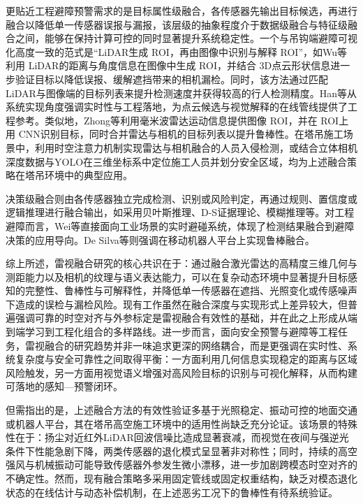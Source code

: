更贴近工程避障预警需求的是目标属性级融合，各传感器先输出目标候选，再进行融合以降低单一传感器误报与漏报，该层级的抽象程度介于数据级融合与特征级融合之间，能够在保持计算可控的同时显著提升系统稳定性。一个与吊钩端避障可视化高度一致的范式是“LiDAR生成 ROI，再由图像中识别与解释 ROI”，如Wu等\cite{VWFQEPVD} 利用 LiDAR的距离与角度信息在图像中生成 ROI，并结合 3D点云形状信息进一步验证目标以降低误报、缓解遮挡带来的相机漏检。同时，该方法通过匹配 LiDAR与图像端的目标列表来提升检测速度并获得较高的行人检测精度。Han等\cite{B46NC5I5}从系统实现角度强调实时性与工程落地，为点云候选与视觉解释的在线管线提供了工程参考。类似地，Zhong等\cite{IPFD4E6N}利用毫米波雷达运动信息提供图像 ROI，并在 ROI上用 CNN识别目标，同时合并雷达与相机的目标列表以提升鲁棒性。在塔吊施工场景中，利用时空注意力机制实现雷达与相机融合的人员入侵检测\cite{1}，或结合立体相机深度数据与YOLO在三维坐标系中定位施工人员并划分安全区域\cite{2}，均为上述融合策略在塔吊环境中的典型应用。

决策级融合则由各传感器独立完成检测、识别或风险判定，再通过规则、置信度或逻辑推理进行融合输出，如采用贝叶斯推理、D-S证据理论、模糊推理等。对工程避障而言，Wei等\cite{Z8QR9XPU}直接面向工业场景的实时避碰系统，体现了检测结果融合到避障决策的应用导向。De Silva等\cite{687GA9DL}则强调在移动机器人平台上实现鲁棒融合。

综上所述，雷视融合研究的核心共识在于：通过融合激光雷达的高精度三维几何与测距能力以及相机的纹理与语义表达能力，可以在复杂动态环境中显著提升目标感知的完整性、鲁棒性与可解释性，并降低单一传感器在遮挡、光照变化或传感噪声下造成的误检与漏检风险。现有工作虽然在融合深度与实现形式上差异较大，但普遍强调可靠的时空对齐与外参标定是雷视融合有效性的基础，并在此之上形成从端到端学习到工程化组合的多样路线。进一步而言，面向安全预警与避障等工程任务，雷视融合的研究趋势并非一味追求更深的网络耦合，而是更强调在实时性、系统复杂度与安全可靠性之间取得平衡：一方面利用几何信息实现稳定的距离与区域风险触发，另一方面用视觉语义增强对高风险目标的识别与可视化解释，从而构建可落地的感知---预警闭环。

但需指出的是，上述融合方法的有效性验证多基于光照稳定、振动可控的地面交通或机器人平台，其在塔吊高空施工环境中的适用性尚缺乏充分论证\cite{4}。该场景的特殊性在于：扬尘对近红外LiDAR回波信噪比造成显著衰减\cite{Li2023Polarized}，而视觉在夜间与强逆光条件下性能急剧下降，两类传感器的退化模式呈显著非对称性；同时，持续的高空强风与机械振动可能导致传感器外参发生微小漂移\cite{Moon2024OnlineCalib}，进一步加剧跨模态时空对齐的不确定性。然而，现有融合策略多采用固定管线或固定权重结构，缺乏对模态退化状态的在线估计与动态补偿机制，在上述恶劣工况下的鲁棒性有待系统验证。

